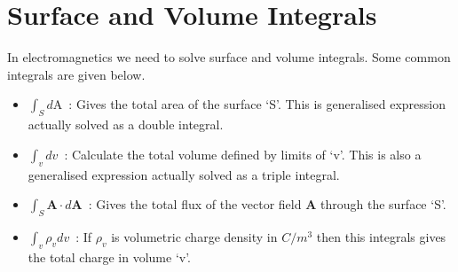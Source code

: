 \documentclass[12pt,a4paper]{article}
\begin{document}
\section{Surface and Volume Integrals}
In electromagnetics we need to solve surface and volume integrals. Some common integrals are given below.
\begin{itemize}
\item $\int_{S} d\mathrm{A}$~: Gives the total area of the surface `S'. This is generalised expression actually solved as a double integral.
\item $\int_{v} dv$~: Calculate the total volume defined by limits of `v'. This is also a generalised expression actually solved as a triple integral.
\item $\int_{S}\textbf{A}\cdot d\textbf{A}$~: Gives the total flux of the vector field \textbf{A} through the surface `S'.
\item $\int_{v}\rho_v dv$~: If $\rho_v$ is volumetric charge density in $C/m^3$ then this integrals gives the total charge in volume `v'.
\end{itemize}
%
\end{document}
